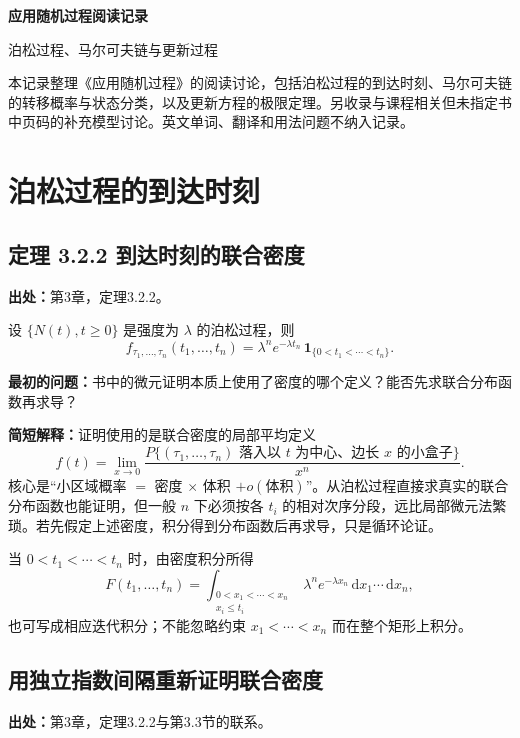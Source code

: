 \documentclass[11pt,a4paper]{ctexart}
\newcommand{\dd}{\,\mathrm d}
\begin{document}
\begin{center}
  {\LARGE\bfseries 应用随机过程阅读记录}\par
  \vspace{0.5em}
  {\large 泊松过程、马尔可夫链与更新过程}
\end{center}

\noindent 本记录整理《应用随机过程》的阅读讨论，包括泊松过程的到达时刻、马尔可夫链的转移概率与状态分类，以及更新方程的极限定理。另收录与课程相关但未指定书中页码的补充模型讨论。英文单词、翻译和用法问题不纳入记录。

\section{泊松过程的到达时刻}

\subsection{定理 3.2.2 到达时刻的联合密度}
\label{note:sp-poisson-arrival-density}
\textbf{出处：}第3章，定理3.2.2。

设 $\{N(t),t\ge0\}$ 是强度为 $\lambda$ 的泊松过程，则
\[
 f_{\tau_1,\ldots,\tau_n}(t_1,\ldots,t_n)
 =\lambda^n e^{-\lambda t_n}\,
 \mathbf 1_{\{0<t_1<\cdots<t_n\}}.
\]

\textbf{最初的问题：}书中的微元证明本质上使用了密度的哪个定义？能否先求联合分布函数再求导？

\textbf{简短解释：}证明使用的是联合密度的局部平均定义
\[
 f(t)=\lim_{x\to0}\frac{P\{(\tau_1,\ldots,\tau_n)
 \text{ 落入以 }t\text{ 为中心、边长 }x\text{ 的小盒子}\}}{x^n}.
\]
核心是“小区域概率 $=$ 密度 $\times$ 体积 $+o(\text{体积})$”。从泊松过程直接求真实的联合分布函数也能证明，但一般 $n$ 下必须按各 $t_i$ 的相对次序分段，远比局部微元法繁琐。若先假定上述密度，积分得到分布函数后再求导，只是循环论证。

当 $0<t_1<\cdots<t_n$ 时，由密度积分所得
\[
 F(t_1,\ldots,t_n)=
 \int_{\substack{0<x_1<\cdots<x_n\\x_i\le t_i}}
 \lambda^n e^{-\lambda x_n}\dd x_1\cdots\dd x_n,
\]
也可写成相应迭代积分；不能忽略约束 $x_1<\cdots<x_n$ 而在整个矩形上积分。

\subsection{用独立指数间隔重新证明联合密度}
\label{note:sp-poisson-jacobian-proof}
\textbf{出处：}第3章，定理3.2.2与第3.3节的联系。
\end{document}
